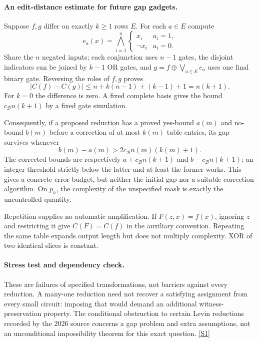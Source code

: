\documentclass[11pt,a4paper]{article}
\newcommand{\sref}[2]{\hyperlink{source:#1:#2}{[S#2]}}
\numberwithin{equation}{section}
\begin{document}
\paragraph{An edit-distance estimate for future gap gadgets.}
Suppose $f,g$ differ on exactly $k\ge1$ rows $E$. For each $a\in E$ compute
\[
 e_a(x)=\bigwedge_{i=1}^n
 \begin{cases}x_i&a_i=1,\\ \neg x_i&a_i=0.
 \end{cases}
\]
Share the $n$ negated inputs; each conjunction uses $n-1$ gates, the disjoint
indicators can be joined by $k-1$ OR gates, and
$g=f\mathbin{\oplus}\bigvee_{a\in E}e_a$ uses one final binary gate.
Reversing the roles of $f,g$ proves
\begin{equation}\label{30006744:edit}
 |C(f)-C(g)|\le n+k(n-1)+(k-1)+1=n(k+1).
\end{equation}
For $k=0$ the difference is zero. A fixed complete basis gives the bound
$c_{\mathcal B}n(k+1)$ by a fixed gate simulation.

Consequently, if a proposed reduction has a proved yes-bound $a(m)$ and
no-bound $b(m)$ before a correction of at most $k(m)$ table entries, its gap
survives whenever
\[
 b(m)-a(m)>2c_{\mathcal B}n(m)(k(m)+1).
\]
The corrected bounds are respectively $a+c_{\mathcal B}n(k+1)$ and
$b-c_{\mathcal B}n(k+1)$; an integer threshold strictly below the latter
and at least the former works. This gives a concrete error budget, but
neither the initial gap nor a suitable correction algorithm. On $p_h$, the
complexity of the unspecified mask is exactly the uncontrolled quantity.

Repetition supplies no automatic amplification. If $F(z,x)=f(x)$, ignoring
$z$ and restricting it give $C(F)=C(f)$ in the auxiliary convention.
Repeating the same table expands output length but does not multiply
complexity. XOR of two identical slices is constant.

\paragraph{Stress test and dependency check.}
These are failures of specified transformations, not barriers against every
reduction. A many-one reduction need not recover a satisfying assignment
from every small circuit: imposing that would demand an additional
witness-preservation property. The conditional obstruction to certain Levin
reductions recorded by the 2026 source concerns a gap problem and extra
assumptions, not an unconditional impossibility theorem for this exact
question. \sref{30006744}{1}
\end{document}
